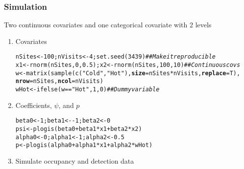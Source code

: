 \documentclass[color=usenames,dvipsnames]{beamer}\usepackage[]{graphicx}\usepackage[]{color}
\makeatletter
\newcommand{\hlnum}[1]{\textcolor[rgb]{0.69,0.494,0}{#1}}%
\newcommand{\hlstr}[1]{\textcolor[rgb]{0.749,0.012,0.012}{#1}}%
\newcommand{\hlcom}[1]{\textcolor[rgb]{0.514,0.506,0.514}{\textit{#1}}}%
\newcommand{\hlopt}[1]{\textcolor[rgb]{0,0,0}{#1}}%
\newcommand{\hlstd}[1]{\textcolor[rgb]{0,0,0}{#1}}%
\newcommand{\hlkwb}[1]{\textcolor[rgb]{0,0.341,0.682}{#1}}%
\newcommand{\hlkwc}[1]{\textcolor[rgb]{0,0,0}{\textbf{#1}}}%
\newcommand{\hlkwd}[1]{\textcolor[rgb]{0.004,0.004,0.506}{#1}}%
\newenvironment{kframe}{%
 \def\at@end@of@kframe{}%
 \ifinner\ifhmode%
  \def\at@end@of@kframe{\end{minipage}}%
  \begin{minipage}{\columnwidth}%
 \fi\fi%
 \def\FrameCommand##1{\hskip\@totalleftmargin \hskip-\fboxsep
 \colorbox{shadecolor}{##1}\hskip-\fboxsep
     \hskip-\linewidth \hskip-\@totalleftmargin \hskip\columnwidth}%
 \MakeFramed {\advance\hsize-\width
   \@totalleftmargin\z@ \linewidth\hsize
   \@setminipage}}%
 {\par\unskip\endMakeFramed%
 \at@end@of@kframe}
\newenvironment{knitrout}{}{} %
\makeatother
\begin{document}
\begin{frame}[fragile]
  \frametitle{Simulation}
  \small
  Two continuous covariates and one categorical covariate with 2 levels
  \vfill
  \begin{enumerate}[<+->]
  \item Covariates
\begin{knitrout}\scriptsize
{}\color{fgcolor}\begin{kframe}
\begin{alltt}
\hlstd{nSites} \hlkwb{<-} \hlnum{100}\hlstd{; nVisits} \hlkwb{<-} \hlnum{4}\hlstd{;} \hlkwd{set.seed}\hlstd{(}\hlnum{3439}\hlstd{)} \hlcom{## Make it reproducible}
\hlstd{x1} \hlkwb{<-} \hlkwd{rnorm}\hlstd{(nSites,}\hlnum{0}\hlstd{,}\hlnum{0.5}\hlstd{); x2} \hlkwb{<-} \hlkwd{rnorm}\hlstd{(nSites,}\hlnum{100}\hlstd{,}\hlnum{10}\hlstd{)} \hlcom{## Continuous covs}
\hlstd{w} \hlkwb{<-} \hlkwd{matrix}\hlstd{(}\hlkwd{sample}\hlstd{(}\hlkwd{c}\hlstd{(}\hlstr{"Cold"}\hlstd{,} \hlstr{"Hot"}\hlstd{),} \hlkwc{size}\hlstd{=nSites}\hlopt{*}\hlstd{nVisits,} \hlkwc{replace}\hlstd{=T),}
            \hlkwc{nrow}\hlstd{=nSites,} \hlkwc{ncol}\hlstd{=nVisits)}
\hlstd{wHot} \hlkwb{<-} \hlkwd{ifelse}\hlstd{(w}\hlopt{==}\hlstr{"Hot"}\hlstd{,} \hlnum{1}\hlstd{,} \hlnum{0}\hlstd{)}              \hlcom{## Dummy variable}
\end{alltt}
\end{kframe}
\end{knitrout}
  \item Coefficients, $\psi$, and $p$
\begin{knitrout}\scriptsize
{}\color{fgcolor}\begin{kframe}
\begin{alltt}
\hlstd{beta0} \hlkwb{<-} \hlnum{1}\hlstd{; beta1} \hlkwb{<-} \hlopt{-}\hlnum{1}\hlstd{; beta2} \hlkwb{<-} \hlnum{0}
\hlstd{psi} \hlkwb{<-} \hlkwd{plogis}\hlstd{(beta0} \hlopt{+} \hlstd{beta1}\hlopt{*}\hlstd{x1} \hlopt{+} \hlstd{beta2}\hlopt{*}\hlstd{x2)}
\hlstd{alpha0} \hlkwb{<-} \hlnum{0}\hlstd{; alpha1} \hlkwb{<-} \hlnum{1}\hlstd{; alpha2} \hlkwb{<-} \hlnum{0.5}
\hlstd{p} \hlkwb{<-} \hlkwd{plogis}\hlstd{(alpha0} \hlopt{+} \hlstd{alpha1}\hlopt{*}\hlstd{x1} \hlopt{+} \hlstd{alpha2}\hlopt{*}\hlstd{wHot)}
\end{alltt}
\end{kframe}
\end{knitrout}
  \item Simulate occupancy and detection data
\begin{knitrout}\scriptsize

\end{knitrout}
\end{enumerate}
\end{frame}
\end{document}
